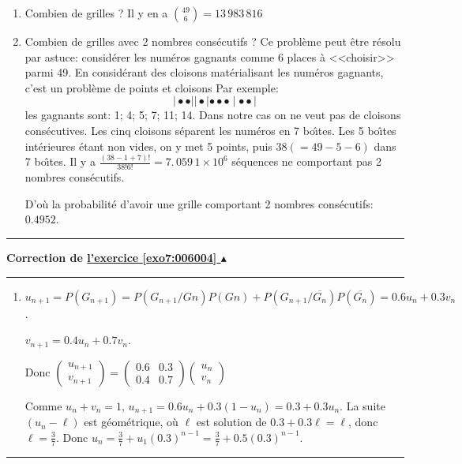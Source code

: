 \documentclass[11pt,a4paper]{article}
\newcounter{exo}
\newcommand{\correction}[1]{\hypertarget{cor7:#1}{}\label{cor7:#1}{\bf Correction de \hyperlink{exo7:#1}{l'exercice \ref{exo7:#1} $\blacktriangle$}}\vspace{1mm}\hrule\vspace{1mm}}
\newcommand{\fincorrection}{\vspace{1mm}\hrule\vspace*{7mm}}
\begin{document}
\begin{enumerate}
  \item Combien de grilles ?
Il y en a $\binom{49}{6}=13\,983\,816$

  \item Combien de grilles avec 2 nombres consécutifs ?
Ce problème peut être résolu par astuce: considérer les numéros gagnants 
comme 6 places à <<choisir>> parmi 49.
En considérant des cloisons matérialisant les numéros gagnants,
c'est un problème de points et cloisons
Par exemple:
$$\mid \bullet \bullet \left\vert {}\right\vert \bullet
\left\vert \bullet \bullet \bullet \mid \bullet \bullet \right\vert$$
les gagnants sont: 1; 4; 5; 7; 11; 14.
Dans notre cas on ne veut pas de cloisons consécutives.
Les cinq cloisons séparent les numéros en 7 bo\^{\i}tes.
Les 5 bo\^{\i}tes intérieures étant non vides, on y met 5 points,
puis $38(=49-5-6)$ dans 7 bo\^{\i}tes.
Il y a $\frac{(38-1+7)!}{38!6!}=7.\,059\,1\times
10^{6}$ séquences ne comportant pas 2 nombres consécutifs.

D'où la probabilité d'avoir une grille
comportant 2 nombres consécutifs: $0.4952$.
\end{enumerate}
\fincorrection
\correction{006004}
\begin{enumerate}
\item $u_{n+1}=P(G_{n+1})=P(G_{n+1}/Gn)P(Gn)+P(G_{n+1}/\overline{G_n})P(\overline{G_n})
=0.6u_{n}+0.3v_{n}$.  

$v_{n+1}=0.4u_{n}+0.7v_{n}$.

Donc $\left( 
\begin{array}{c}
u_{n+1} \\ 
v_{n+1}\end{array}\right) =\left( 
\begin{array}{cc}
0.6 & 0.3 \\ 
0.4 & 0.7\end{array}\right) \left( 
\begin{array}{c}
u_{n} \\ 
v_{n}\end{array}\right)$

Comme $u_{n}+v_{n}=1$, $u_{n+1}=0.6u_{n}+0.3(1-u_{n})=0.3+0.3u_{n}$.
La suite $(u_{n}-\ell)$ est géométrique, où $\ell$ est solution
de $0.3+0.3\ell=\ell$, donc $\ell=\frac{3}{7}$.
Donc $u_{n}=\frac{3}{7}+u_{1}(0.3)^{n-1}=\frac{3}{7}+0.5 (0.3)^{n-1}$.
\end{enumerate}
\fincorrection
\end{document}
